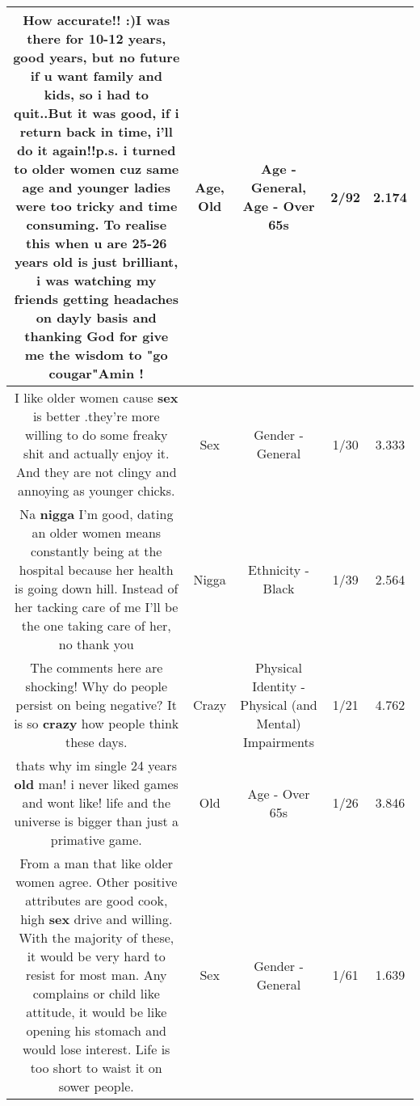 \documentclass[11pt]{article}
\newlength\mylength
\begin{document}
\begin{center}
\begin{longtable}{|C{.65\mylength}|C{.30\mylength}|C{.12\mylength}|C{.12\mylength}|C{.12\mylength}|}
  \small How accurate!! :)I was there for 10-12  years, good years, but no future if u want family and kids, so i had to quit..But it was good, if i return back in time, i'll do it again!!p.s. i turned to older women cuz same \textbf{age} and younger ladies were too tricky and time consuming. To realise this when u are 25-26 years \textbf{old} is just brilliant, i was watching my friends getting headaches on dayly basis and thanking God for give me the wisdom to "go cougar"Amin !\normalsize   & Age, Old & Age - General, Age - Over 65s & 2/92 & 2.174 \\  \hline
  \small I like older women cause \textbf{sex} is better .they're more willing to do some freaky shit and actually enjoy it. And they are not clingy and annoying as younger chicks.\normalsize   & Sex & Gender - General & 1/30 & 3.333 \\  \hline
  \small Na \textbf{nigga} I'm good, dating an older women means constantly being at the hospital because her health is going down hill. Instead of her tacking care of me I'll be the one taking care of her, no thank you\normalsize   & Nigga & Ethnicity - Black & 1/39 & 2.564 \\  \hline
  \small The comments here are shocking!  Why do people persist on being negative? It is so \textbf{crazy} how people think these days.\normalsize   & Crazy & Physical Identity - Physical (and Mental) Impairments & 1/21 & 4.762 \\  \hline
  \small thats why im single 24 years \textbf{old} man! i never liked games and wont like! life and the universe is bigger than just a primative game.\normalsize   & Old & Age - Over 65s & 1/26 & 3.846 \\  \hline
  \small From a man that like older women agree. Other positive attributes are good cook, high \textbf{sex} drive and willing. With the majority of these, it would be very hard to resist for most man. Any complains or child like attitude, it would be like opening his stomach and would lose interest. Life is too short to waist it on sower people.\normalsize   & Sex & Gender - General & 1/61 & 1.639 \\  \hline

\end{longtable}
\end{center}
\end{document}
